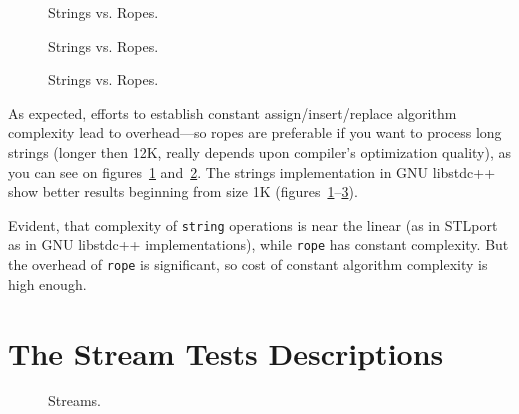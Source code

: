 \documentclass[a4paper]{article}
\providecommand{\STLport}{{\fontfamily{cmss}\selectfont STLport}}
\providecommand{\libstd}{{\fontfamily{cmtt}\selectfont GNU \mbox{libstdc++}}}
\begin{document}


\begin{figure}
  \begin{center}
    
  \end{center}
  \caption{Strings vs. Ropes.\label{STLport-rope-string}}
\end{figure}

\begin{figure}
  \begin{center}
    
  \end{center}
  \caption{Strings vs. Ropes.\label{STLport-rope-string-1}}
\end{figure}

\begin{figure}
  \begin{center}
    
  \end{center}
  \caption{Strings vs. Ropes.\label{STLport-rope-string-2}}
\end{figure}

As expected, efforts to establish constant assign/insert/replace
algorithm complexity lead to
overhead---so ropes are preferable if you want to process
long strings (longer then 12K, really depends upon compiler's optimization quality), as you can see on figures~\ref{STLport-rope-string} and~\ref{STLport-rope-string-1}.
The strings implementation in \libstd{} show better results beginning from size 1K
(figures~\ref{STLport-rope-string}--\ref{STLport-rope-string-2}).

Evident, that complexity of \texttt{string} operations is near the linear
(as in \STLport{} as in \libstd{} implementations),
while \texttt{rope} has constant complexity. But the overhead
of \texttt{rope} is significant, so cost of constant algorithm complexity
is high enough.


\section{The Stream Tests Descriptions\label{StreamTestsDescr}}

\begin{figure}
  \begin{center}
    
  \end{center}
  \caption{Streams.\label{streams}}
\end{figure}
\end{document}
